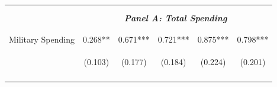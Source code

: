 \documentclass[dv_diss_main.tex]{subfiles}
\begin{document}
\begin{table}[H]
\begin{center}
{\begin{tabular}{lccccc}
    \vspace{-2pt} & \vspace{-2pt} & \vspace{-2pt} & \vspace{-2pt} & \vspace{-2pt} \\\hline
    \vspace{-1.5pt} & \vspace{-1.5pt} & \vspace{-1.5pt} & \vspace{-1.5pt} & \vspace{-1.5pt} \\
    \cmidrule{2-6}
    \vspace{-1.5pt} & \vspace{-1.5pt} & \vspace{-1.5pt} & \vspace{-1.5pt} & \vspace{-1.5pt} \\
    & \multicolumn{5}{c}{\textit{\textbf{Panel A: Total Spending}}} \\ 
    \vspace{-1.5pt} & \vspace{-1.5pt} & \vspace{-1.5pt} & \vspace{-1.5pt} & \vspace{-1.5pt} \\ 
    \cmidrule{2-6}
    \vspace{-1.5pt} & \vspace{-1.5pt} & \vspace{-1.5pt} & \vspace{-1.5pt} & \vspace{-1.5pt}\\
     Military Spending & 0.268** & 0.671*** & 0.721*** & 0.875*** & 0.798*** \\
     & \begin{footnotesize}(0.103)\end{footnotesize} & \begin{footnotesize}(0.177)\end{footnotesize} & \begin{footnotesize}(0.184)\end{footnotesize} & \begin{footnotesize}(0.224)\end{footnotesize} & \begin{footnotesize}(0.201)\end{footnotesize} \\
    \vspace{-1.5pt} & \vspace{-1.5pt} & \vspace{-1.5pt} & \vspace{-1.5pt} & \vspace{-1.5pt} \\
    

\end{tabular}}
\end{center}
\end{table}
\end{document}
